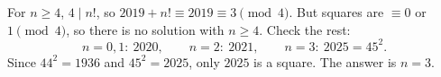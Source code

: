 For $n\ge4$, $4\mid n!$, so $2019+n!\equiv2019\equiv3\pmod4$. But squares are $\equiv0$ or $1\pmod4$, so there is no solution with $n\ge4$. Check the rest:
\[
n=0,1:\ 2020,\qquad n=2:\ 2021,\qquad n=3:\ 2025=45^2 .
\]
Since $44^2=1936$ and $45^2=2025$, only $2025$ is a square. The answer is $\boxed{n=3}$.
